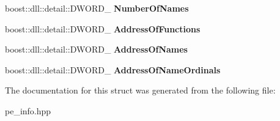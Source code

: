 \begin{DoxyCompactItemize}
\item 
boost\+::dll\+::detail\+::\+D\+W\+O\+R\+D\+\_\+ {\bfseries Number\+Of\+Names}\hypertarget{a00146_a6fd30ba5be0d6349aa2398a6a4c57eb2}{}\label{a00146_a6fd30ba5be0d6349aa2398a6a4c57eb2}

\item 
boost\+::dll\+::detail\+::\+D\+W\+O\+R\+D\+\_\+ {\bfseries Address\+Of\+Functions}\hypertarget{a00146_a4d24e72a4f88a4c2f6f5205d8cd692a6}{}\label{a00146_a4d24e72a4f88a4c2f6f5205d8cd692a6}

\item 
boost\+::dll\+::detail\+::\+D\+W\+O\+R\+D\+\_\+ {\bfseries Address\+Of\+Names}\hypertarget{a00146_a6bcb8739e2a4a7971e0b8586feecbfde}{}\label{a00146_a6bcb8739e2a4a7971e0b8586feecbfde}

\item 
boost\+::dll\+::detail\+::\+D\+W\+O\+R\+D\+\_\+ {\bfseries Address\+Of\+Name\+Ordinals}\hypertarget{a00146_a86a84a8297c28379940f9f748310af8b}{}\label{a00146_a86a84a8297c28379940f9f748310af8b}

\end{DoxyCompactItemize}


The documentation for this struct was generated from the following file\+:\begin{DoxyCompactItemize}
\item 
pe\+\_\+info.\+hpp\end{DoxyCompactItemize}
